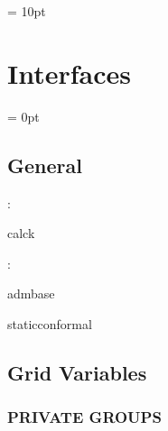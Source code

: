 \vspace{0.5cm}\parskip = 10pt 

\section{Interfaces} 


\parskip = 0pt

\vspace{3mm} \subsection*{General}

: 

calck
\vspace{2mm}

: 

admbase

staticconformal
\vspace{2mm}
\subsection*{Grid Variables}
\vspace{5mm}\subsubsection{PRIVATE GROUPS}

\vspace{5mm}

